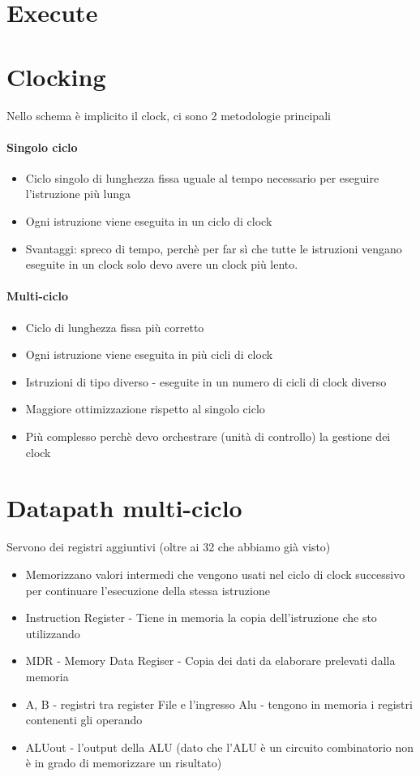 \documentclass[12pt, a4paper, openany]{book}
\begin{document}
\section*{Execute}
\section*{Clocking}
Nello schema è implicito il clock, ci sono 2 metodologie principali
\paragraph*{Singolo ciclo} \begin{itemize}
    \item Ciclo singolo di lunghezza fissa uguale al tempo necessario per eseguire l'istruzione
    più lunga
    \item Ogni istruzione viene eseguita in un ciclo di clock
    \item Svantaggi: spreco di tempo, perchè per far sì che tutte le istruzioni vengano eseguite in 
    un clock solo devo avere un clock più lento.
\end{itemize}

\paragraph*{Multi-ciclo} \begin{itemize}
    \item Ciclo di lunghezza fissa più corretto
    \item Ogni istruzione viene eseguita in più cicli di clock
    \item Istruzioni di tipo diverso - eseguite in un numero di cicli di clock diverso
    \item Maggiore ottimizzazione rispetto al singolo ciclo
    \item Più complesso perchè devo orchestrare (unità di controllo) la gestione dei clock
\end{itemize}

\section{Datapath multi-ciclo}
Servono dei registri aggiuntivi (oltre ai 32 che abbiamo già visto)
\begin{itemize}
    \item Memorizzano valori intermedi che vengono usati nel ciclo di clock successivo
    per continuare l'esecuzione della stessa istruzione
    \item Instruction Register - Tiene in memoria la copia dell'istruzione che sto utilizzando
    \item MDR - Memory Data Regiser - Copia dei dati da elaborare prelevati dalla memoria 
    \item A, B - registri tra register File e l'ingresso Alu - tengono in memoria i registri contenenti gli operando
    \item ALUout - l'output della ALU (dato che l'ALU è un circuito combinatorio non è in 
    grado di memorizzare un risultato)
\end{itemize}
\end{document}
